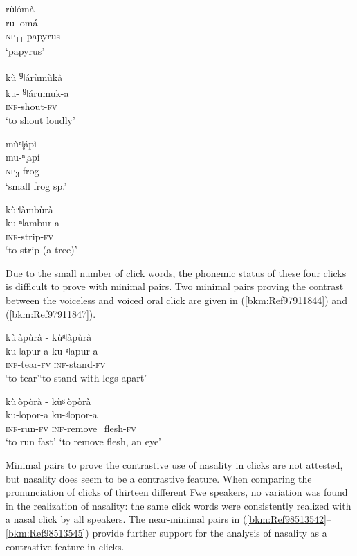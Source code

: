 \ea
\label{bkm:Ref98833153}
\glll rùǀómà\\
ru-ǀomá\\
\textsc{np}\textsubscript{11}-papyrus\\
\glt ‘papyrus’
\z

\ea
\label{bkm:Ref98833164}
\glll kù\textsuperscript{ ɡ}ǀárùmùkà\\
ku-\textsuperscript{ ɡ}ǀárumuk-a\\
\textsc{inf}-shout-\textsc{fv}\\
\glt ‘to shout loudly’
\z

\ea
\label{bkm:Ref98833192}
\glll mùⁿǀ̥ápì\\
mu-ⁿ{ǀ}̥apí\\
\textsc{np}\textsubscript{3}-frog\\
\glt ‘small frog sp.’
\z

\ea
\label{bkm:Ref98833195}
\glll kùⁿǀàmbùrà\\
ku-ⁿǀambur-a\\
\textsc{inf}-strip-\textsc{fv}\\
\glt ‘to strip (a tree)’
\z

Due to the small number of click words, the phonemic status of these four clicks is difficult to prove with minimal pairs. Two minimal pairs proving the contrast between the voiceless and voiced oral click are given in (\ref{bkm:Ref97911844}) and (\ref{bkm:Ref97911847}).

\ea
\label{bkm:Ref97911844}
kùǀàpùrà \tab   - \tab kùᵍǀàpùrà\\
ku-ǀapur-a \tab\tab     ku-ᵍǀapur-a\\
\textsc{inf}-tear-\textsc{fv} \tab\tab      \textsc{inf}-stand-\textsc{fv}\\
\glt ‘to tear’\tab\tab      ‘to stand with legs apart’
\z

\ea
\label{bkm:Ref97911847}
kùǀòpòrà  \tab  - \tab kùᵍǀòpòrà\\
ku-ǀopor-a    \tab\tab   ku-ᵍǀopor-a\\
\textsc{inf}-run-\textsc{fv}   \tab\tab   \textsc{inf}-remove\_flesh-\textsc{fv}\\
\glt ‘to run fast’   \tab\tab   ‘to remove flesh, an eye’
\z

Minimal pairs to prove the contrastive use of nasality in clicks are not attested, but nasality does seem to be a contrastive feature. When comparing the pronunciation of clicks of thirteen differ\-ent Fwe speakers, no variation was found in the realization of nasality: the same click words were consistently realized with a nasal click by all speakers. The near-minimal pairs in (\ref{bkm:Ref98513542}--\ref{bkm:Ref98513545}) provide further support for the analysis of nasality as a contrastive feature in clicks.

